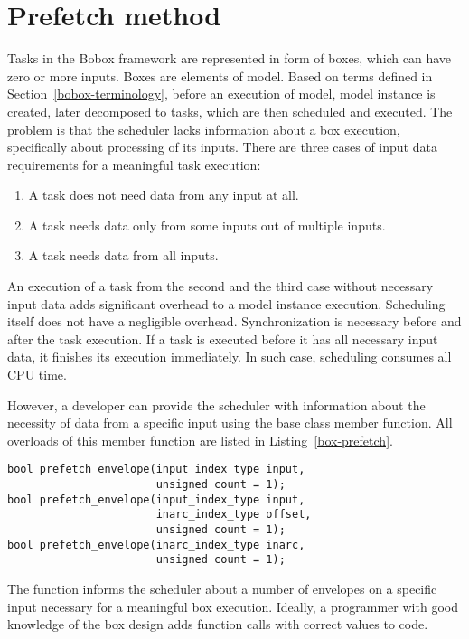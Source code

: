 \chapter{Prefetch method}
\label{prefetch}
Tasks in the Bobox framework are represented in form of boxes, which can have zero or more inputs. Boxes are elements of model. Based on terms defined in Section~\ref{bobox-terminology}, before an execution of model, model instance is created, later decomposed to tasks, which are then scheduled and executed. The problem is that the scheduler lacks information about a box execution, specifically about processing of its inputs. There are three cases of input data requirements for a meaningful task execution:

\begin{enumerate}
\item A task does not need data from any input at all.
\item A task needs data only from some inputs out of multiple inputs.
\item A task needs data from all inputs.
\end{enumerate}

An execution of a task from the second and the third case without necessary input data adds significant overhead to a model instance execution. Scheduling itself does not have a negligible overhead. Synchronization is necessary before and after the task execution. If a task is executed before it has all necessary input data, it finishes its execution immediately. In such case, scheduling consumes all CPU time.

However, a developer can provide the scheduler with information about the necessity of data from a specific input using the  base class member function. All overloads of this member function are listed in Listing~\ref{box-prefetch}.

\begin{lstlisting}[caption={\code{basic\_box} prefetch member function overloads.},label={box-prefetch}]
bool prefetch_envelope(input_index_type input,
                       unsigned count = 1);
bool prefetch_envelope(input_index_type input,
                       inarc_index_type offset,
                       unsigned count = 1);
bool prefetch_envelope(inarc_index_type inarc,
                       unsigned count = 1);
\end{lstlisting}

The function informs the scheduler about a number of envelopes on a specific input necessary for a meaningful box execution. Ideally, a programmer with good knowledge of the box design adds function calls with correct values to code.

